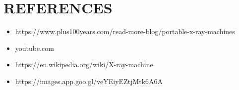\documentclass[12pt]{article}
\begin{document}
\section{REFERENCES}
\begin{itemize}
\item https://www.plus100years.com/read-more-blog/portable-x-ray-machines
\item youtube.com
\item https://en.wikipedia.org/wiki/X-ray-machine
\item https://images.app.goo.gl/veYEiyEZtjMtk6A6A
\end{itemize}


%
%
\end{document}
